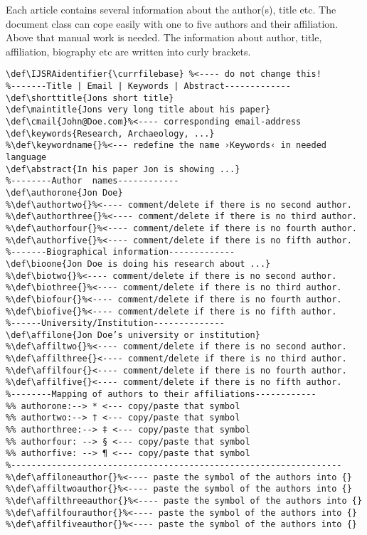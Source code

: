 \documentclass[
	]{ijsra}
\makeatletter
\def\IJSRAidentifier{\currfilebase}
\def\authorone{Lukas C. Bossert}
\def\bioone{The coding of this documentclass is done at \href{https://github.com/LukasCBossert/documentclass-ijsra}{https://github.com/LukasCBossert/documentclass-ijsra} }
\def\shorttitle{The \texttt{ijsra}-class, Version \IJSRAversion\ -- \IJSRAversiondate}
\def\maintitle{\shorttitle}
\def\abstract{This is a documentation of the class \texttt{ijsra} which is used for the
 \emph{International Journal of Student Research in Archaeology}.
 Read this documentation carefully.
 When you start editing do it according to the structure shown in \cref{document}.}
\def\affilone{Humboldt-Universität zu Berlin | Excellence-Cluster Topoi}
\def\cmail{lukas@digitales-altertum.de}
\def\keywords{documentclass, \LaTeX , IJSRA}
\makeatother
\begin{document}
\IJSRAseparator
Each article contains several information about the author(s), title etc. 
The document class can cope easily with one to five authors and their affiliation. 
Above that manual work is needed.
The information about author, title, affiliation, biography etc are written into curly brackets.
\begin{lstlisting}[label=information,caption={Information about the article}]
\def\IJSRAidentifier{\currfilebase} %<---- do not change this!
%-------Title | Email | Keywords | Abstract-------------
\def\shorttitle{Jons short title}
\def\maintitle{Jons very long title about his paper}
\def\cmail{John@Doe.com}%<---- corresponding email-address
\def\keywords{Research, Archaeology, ...}
%\def\keywordname{}%<--- redefine the name ›Keywords‹ in needed language
\def\abstract{In his paper Jon is showing ...}
%--------Author  names------------
\def\authorone{Jon Doe}
%\def\authortwo{}%<---- comment/delete if there is no second author.
%\def\authorthree{}%<---- comment/delete if there is no third author.
%\def\authorfour{}%<---- comment/delete if there is no fourth author.
%\def\authorfive{}%<---- comment/delete if there is no fifth author.
%-------Biographical information-------------
\def\bioone{Jon Doe is doing his research about ...}
%\def\biotwo{}%<---- comment/delete if there is no second author.
%\def\biothree{}%<---- comment/delete if there is no third author.
%\def\biofour{}%<---- comment/delete if there is no fourth author.
%\def\biofive{}%<---- comment/delete if there is no fifth author.
%------University/Institution--------------
\def\affilone{Jon Doe’s university or institution}
%\def\affiltwo{}%<---- comment/delete if there is no second author.
%\def\affilthree{}<---- comment/delete if there is no third author.
%\def\affilfour{}<---- comment/delete if there is no fourth author.
%\def\affilfive{}<---- comment/delete if there is no fifth author.
%--------Mapping of authors to their affiliations------------
%% authorone:--> * <--- copy/paste that symbol
%% authortwo:--> † <--- copy/paste that symbol
%% authorthree:--> ‡ <--- copy/paste that symbol
%% authorfour: --> § <--- copy/paste that symbol
%% authorfive: --> ¶ <--- copy/paste that symbol
%-----------------------------------------------------------------
%\def\affiloneauthor{}%<---- paste the symbol of the authors into {}
%\def\affiltwoauthor{}%<---- paste the symbol of the authors into {}
%\def\affilthreeauthor{}%<---- paste the symbol of the authors into {}
%\def\affilfourauthor{}%<---- paste the symbol of the authors into {}
%\def\affilfiveauthor{}%<---- paste the symbol of the authors into {}
\end{lstlisting}
\end{document}
